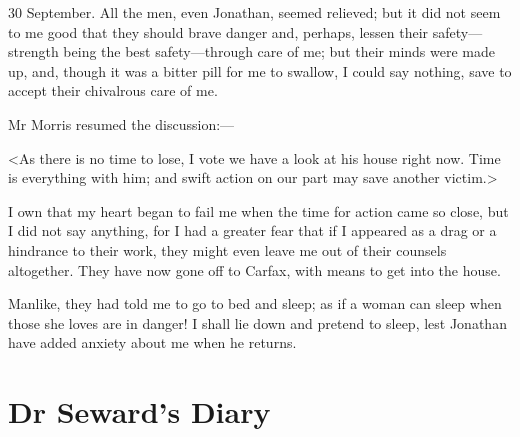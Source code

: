 \begin{diary}{30 September.}
All the men, even Jonathan, seemed relieved; but it did not seem to me good that they should brave danger and, perhaps, lessen their safety—strength being the best safety—through care of me; but their minds were made up, and, though it was a bitter pill for me to swallow, I could say nothing, save to accept their chivalrous care of me.

Mr Morris resumed the discussion:—

<As there is no time to lose, I vote we have a look at his house right now. Time is everything with him; and swift action on our part may save another victim.>

I own that my heart began to fail me when the time for action came so close, but I did not say anything, for I had a greater fear that if I appeared as a drag or a hindrance to their work, they might even leave me out of their counsels altogether. They have now gone off to Carfax, with means to get into the house.

Manlike, they had told me to go to bed and sleep; as if a woman can sleep when those she loves are in danger! I shall lie down and pretend to sleep, lest Jonathan have added anxiety about me when he returns.
\end{diary}

\section{Dr Seward's Diary}


